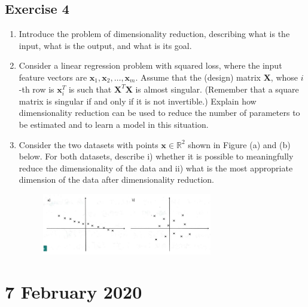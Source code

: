 \documentclass[a4paper,11pt,oneside]{book}
\begin{document}
\section{Exercise 4}
\begin{enumerate}
\item Introduce the problem of dimensionality reduction, describing what is the input, what is the output, and what is its goal.

\item Consider a linear regression problem with squared loss, where the input feature vectors are $\mathbf{x}_1, \mathbf{x}_2, \ldots, \mathbf{x}_m$. Assume that the (design) matrix $\mathbf{X}$, whose $i$-th row is $\mathbf{x}_i^T$ is such that $\mathbf{X}^T\mathbf{X}$ is almost singular. (Remember that a square matrix is singular if and only if it is not invertible.) Explain how dimensionality reduction can be used to reduce the number of parameters to be estimated and to learn a model in this situation.

\item Consider the two datasets with points $\mathbf{x} \in \mathbb{R}^2$ shown in Figure (a) and (b) below. For both datasets, describe i) whether it is possible to meaningfully reduce the dimensionality of the data and ii) what is the most appropriate dimension of the data after dimensionality reduction.
    \begin{figure}[H]
        \centering
        \includegraphics[width=0.7\textwidth,height=0.7\textheight,keepaspectratio]{images/4_21_Feb_2020.png}
    \end{figure}
\end{enumerate}


\chapter{7 February 2020}
\end{document}
